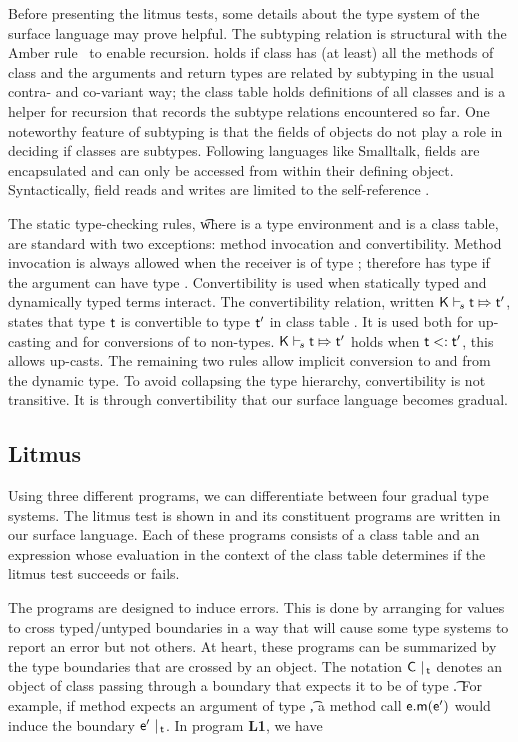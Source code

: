 \documentclass[USenglish]{tex/lipics-v2016}
\begin{document}
Before presenting the litmus tests, some details about the type system of the
surface language may prove helpful. The subtyping relation is structural
with the Amber rule~\cite{cardelli1985amber} to enable recursion. \StrSub\M\K\C\D holds if class
\C has (at least) all the methods of class \D and the arguments and return
types are related by subtyping in the usual contra- and co-variant way; the
class table \K holds definitions of all classes and \M is a helper for
recursion that records the subtype relations encountered so far. One noteworthy feature of subtyping is that the fields of objects
do not play a role in deciding if classes are subtypes. Following languages
like Smalltalk, fields are encapsulated and can only be accessed from within their
defining object. Syntactically, field reads and writes are limited to
the self-reference \this. 

The static type-checking rules,   \EnvTypeS \Env\K\e\t where \Env is 
a type environment and \K is a class table,
 are standard with two exceptions: method invocation and convertibility. 
Method invocation is always allowed when the receiver \e is of 
type \any; therefore  has type \any if the argument
can have type \any. Convertibility 
is used when statically typed and dynamically typed terms
interact. The convertibility relation, written $\ConvertE\K s\t\tp$, states
that type $\t$ is convertible to type $\tp$ in class table \K.  It
is used both for up-casting and for conversions of \any to non-\any types.
$\ConvertE\K s\t\tp$ holds when $\t\Sub\tp$, this allows up-casts. The
remaining two rules allow implicit conversion to and from the dynamic type.
To avoid collapsing the type hierarchy, convertibility is not transitive.
It is through convertibility that our surface language becomes gradual.


\subsection{Litmus}

Using three different programs, we can differentiate between four gradual
type systems. The litmus test is shown in  and its
constituent programs are written in our surface language.  Each of these
programs consists of a class table and an expression whose evaluation in
the context of the class table determines if the litmus test succeeds or
fails.

The programs are designed to induce errors.  This is done by arranging for
values to cross typed/untyped boundaries in a way that will cause some type
systems to report an error but not others. At heart, these programs can 
be summarized by the
type boundaries that are crossed by an object. The
notation $\C ~\vert_{\,\t}$ denotes an object of class \C passing
through a boundary that expects it to be of type \t. For example,
if method \m expects an argument of type \t, a method call $\e.\m(\ep)$ would
induce the boundary $\ep ~\vert_{\,\t}$. 
In program {\bf L1}, we have 
\end{document}
